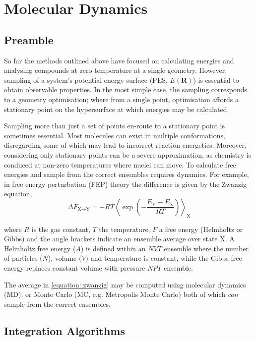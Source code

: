 \documentclass[main.tex]{subfiles}
\begin{document}
\section{Molecular Dynamics}
\subsection{Preamble}
So far the methods outlined above have focused on calculating energies and analysing compounds at zero temperature at a single geometry. However, sampling of a system's potential energy surface (PES, $E(\boldsymbol{R})$) is essential to obtain observable properties. In the most simple case, the sampling corresponds to a geometry optimisation; where from a single point, optimisation affords a stationary point on the hypersurface at which energies may be calculated. 

Sampling more than just a set of points en-route to a stationary point is sometimes essential. Most molecules can exist in multiple conformations, disregarding some of which may lead to incorrect reaction energetics.\cite{Hawkins2017} Moreover, considering only stationary points can be a severe approximation, as chemistry is conduced at non-zero temperatures where nuclei can move. To calculate free energies and sample from the correct ensembles requires dynamics. For example, in free energy perturbation (FEP)  theory the difference is given by the Zwanzig equation,
\begin{equation}
	\Delta F_{\text{X}\rightarrow\text{Y}} = -R T \left\langle \exp\left( - \frac{E_\text{Y} - E_\text{X}}{RT} \right) \right\rangle_\text{X}
	\label{equation::zwanzig}
\end{equation}

where $R$ is the gas constant, $T$ the temperature, $F$ a free energy (Helmholtz or Gibbs) and the angle brackets indicate an ensemble average over state X. A Helmholtz free energy ($A$) is defined within an $NVT$ ensemble where the number of particles ($N$), volume ($V$) and temperature is constant, while the Gibbs free energy replaces constant volume with pressure $NPT$ ensemble.

The average in \eqref{equation::zwanzig} may be computed using molecular dynamics (MD), or Monte Carlo (MC, e.g. Metropolis Monte Carlo) both of which \emph{can} sample from the correct ensembles.


\subsection{Integration Algorithms}
\end{document}
